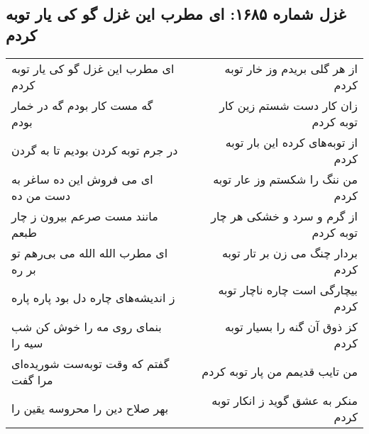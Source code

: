 \begin{center}
\section*{غزل شماره ۱۶۸۵: ای مطرب این غزل گو کی یار توبه کردم}
\label{sec:1685}
\begin{longtable}{l p{0.5cm} r}
ای مطرب این غزل گو کی یار توبه کردم
&&
از هر گلی بریدم وز خار توبه کردم
\\
گه مست کار بودم گه در خمار بودم
&&
زان کار دست شستم زین کار توبه کردم
\\
در جرم توبه کردن بودیم تا به گردن
&&
از توبه‌های کرده این بار توبه کردم
\\
ای می فروش این ده ساغر به دست من ده
&&
من ننگ را شکستم وز عار توبه کردم
\\
مانند مست صرعم بیرون ز چار طبعم
&&
از گرم و سرد و خشکی هر چار توبه کردم
\\
ای مطرب الله الله می بی‌رهم تو بر ره
&&
بردار چنگ می زن بر تار توبه کردم
\\
ز اندیشه‌های چاره دل بود پاره پاره
&&
بیچارگی است چاره ناچار توبه کردم
\\
بنمای روی مه را خوش کن شب سیه را
&&
کز ذوق آن گنه را بسیار توبه کردم
\\
گفتم که وقت توبه‌ست شوریده‌ای مرا گفت
&&
من تایب قدیمم من پار توبه کردم
\\
بهر صلاح دین را محروسه یقین را
&&
منکر به عشق گوید ز انکار توبه کردم
\\
\end{longtable}
\end{center}
